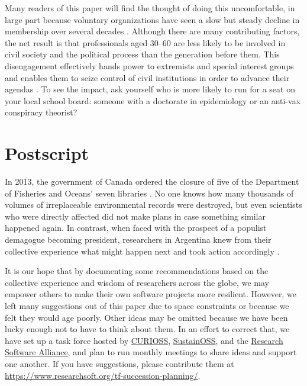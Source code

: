 \documentclass[10pt,letterpaper]{article}
\begin{document}
Many readers of this paper will find the thought of doing this uncomfortable,
in large part because
voluntary organizations have seen a slow but steady decline in membership over several decades \cite{Putnam2020}.
Although there are many contributing factors,
the net result is that professionals aged 30--60
are less likely to be involved in civil society and the political process than the generation before them.
This disengagement effectively hands power to extremists and special interest groups
and enables them to seize control of civil institutions in order to advance their agendas \cite{BuenoDeMesquita2022}.
To see the impact,
ask yourself who is more likely to run for a seat on your local school board:
someone with a doctorate in epidemiology or an anti-vax conspiracy theorist?

\section*{Postscript}

In 2013,
the government of Canada ordered the closure of
five of the Department of Fisheries and Oceans' seven libraries \cite{Nikiforuk2013}.
No one knows how many thousands of volumes of irreplaceable environmental records were destroyed,
but even scientists who were directly affected did not make plans in case something similar happened again.
In contrast,
when faced with the prospect of a populist demagogue becoming president,
researchers in Argentina knew from their collective experience what might happen next
and took action accordingly \cite{DelBoca2024}.

It is our hope that by documenting some recommendations based on the collective experience and wisdom of researchers across the globe,
we may empower others to make their own software projects more resilient.
However, we left many suggestions out of this paper due to space constraints
or because we felt they would age poorly.
Other ideas may be omitted because
we have been lucky enough not to have to think about them.
In an effort to correct that,
we have set up a task force hosted by \href{https://curioss.org}{CURIOSS},
\href{https://sustainoss.org}{SustainOSS},
and the \href{https://www.researchsoft.org//}{Research Software Alliance},
and plan to run monthly meetings
to share ideas and support one another.
If you have suggestions,
please contribute them at \url{https://www.researchsoft.org/tf-succession-planning/}.



\end{document}
